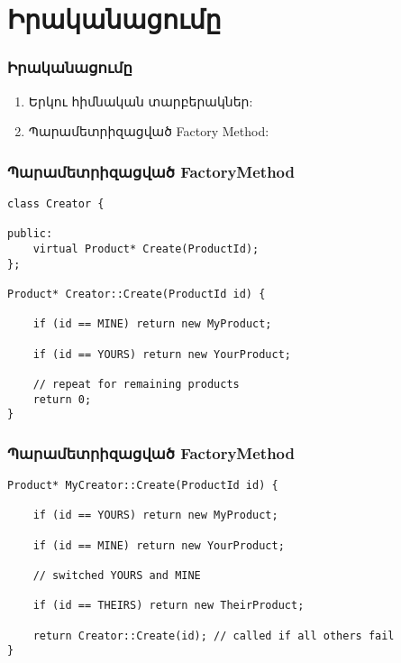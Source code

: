 \documentclass{beamer}
\begin{document}
\section{Իրականացումը}
\begin{frame}\frametitle{Իրականացումը}
\begin{enumerate}
    \item Երկու հիմնական տարբերակներ: \vspace{0.5cm}
    \item Պարամետրիզացված Factory Method: \vfill
\end{enumerate}
\end{frame}

\begin{frame}[fragile]\frametitle{Պարամետրիզացված FactoryMethod}
\begin{english}
\begin{verbatim}
class Creator {

public:
    virtual Product* Create(ProductId);
};

Product* Creator::Create(ProductId id) {

    if (id == MINE) return new MyProduct;

    if (id == YOURS) return new YourProduct;

    // repeat for remaining products
    return 0;
}
\end{verbatim}
\end{english}
\end{frame}

\begin{frame}[fragile]\frametitle{Պարամետրիզացված FactoryMethod}
\begin{english}
\begin{verbatim}
Product* MyCreator::Create(ProductId id) {

    if (id == YOURS) return new MyProduct;

    if (id == MINE) return new YourProduct;

    // switched YOURS and MINE

    if (id == THEIRS) return new TheirProduct;

    return Creator::Create(id); // called if all others fail
}
\end{verbatim}
\end{english}
\end{frame}
\end{document}
